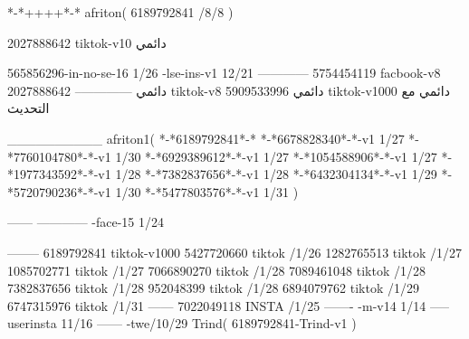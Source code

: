 *-*++++*-*
afriton(
6189792841 /8/8
)

2027888642 tiktok-v10
دائمي

565856296-in-no-se-16 1/26
-lse-ins-v1 12/21
------------
5754454119 facbook-v8
دائمي
--------------
2027888642 tiktok-v8
دائمي
5909533996 tiktok-v1000
دائمي مع التحديث

__________
afriton1(
*-*6189792841*-*
*-*6678828340*-*-v1 1/27
*-*7760104780*-*-v1 1/30
*-*6929389612*-*-v1 1/27
*-*1054588906*-*-v1 1/27
*-*1977343592*-*-v1 1/28
*-*7382837656*-*-v1 1/28
*-*6432304134*-*-v1 1/29
*-*5720790236*-*-v1 1/30
*-*5477803576*-*-v1 1/31
)

------
------------
-face-15 1/24

--------
6189792841 tiktok-v1000
5427720660 tiktok /1/26
1282765513 tiktok /1/27
1085702771 tiktok /1/27
7066890270 tiktok /1/28
7089461048 tiktok /1/28
7382837656 tiktok /1/28
952048399 tiktok /1/28
6894079762 tiktok /1/29
6747315976 tiktok /1/31
------
7022049118 INSTA /1/25
-------
-m-v14 1/14
-----
userinsta 11/16
------
-twe/10/29
Trind(
6189792841-Trind-v1 
)

